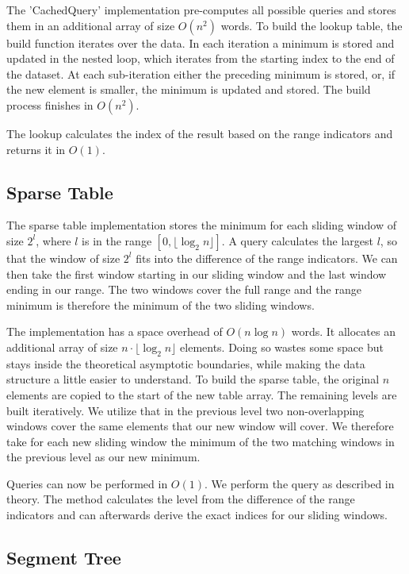 \documentclass[a4paper,UKenglish,cleveref,thm-restate]{lipics-v2021}
\begin{document}
The 'CachedQuery' implementation pre-computes all possible queries and stores them in an additional 
array of size $O(n^2)$ words. To build the lookup table, the build function iterates over the data.
In each iteration a minimum is stored and updated in the nested loop, which iterates from the starting 
index to the end of the dataset. At each sub-iteration either the preceding minimum is stored, or, if the new 
element is smaller, the minimum is updated and stored. The build process finishes in $O(n^2)$. 

The lookup calculates the index of the result based on the range indicators and returns it in $O(1)$.

\subsection{Sparse Table}

The sparse table implementation stores the minimum for each sliding window of size $2^l$, 
where $l$ is in the range $[0, \lfloor\log_2{n}\rfloor]$. A query calculates the largest $l$,
so that the window of size $2^l$ fits into the difference of the range indicators. 
We can then take the first window starting in our sliding window and the last window ending 
in our range. The two windows cover the full range and the range minimum is therefore the 
minimum of the two sliding windows. 

The implementation has a space overhead of $O(n \log{n})$ words. It allocates an additional 
array of size $n\cdot\lfloor\log_2{n}\rfloor$ elements. Doing so wastes some space but stays 
inside the theoretical asymptotic boundaries, while making the data structure a little easier 
to understand. To build the sparse table, the original $n$ elements are copied to the start of
the new table array. The remaining levels are built iteratively. We utilize that in the previous level
two non-overlapping windows cover the same elements that our new window will cover. We therefore take 
for each new sliding window the minimum of the two matching windows in the previous level as our new 
minimum.

Queries can now be performed in $O(1)$. We perform the query as described in theory. The method 
calculates the level from the difference of the range indicators and can afterwards derive the 
exact indices for our sliding windows.  

\subsection{Segment Tree}
\end{document}
